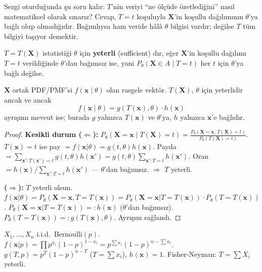 \begin{tanimgerekce}
Sezgi oturduğunda şu soru kalır: $T$'nin veriyi ``ne ölçüde özetlediğini''
nasıl matematiksel olarak sınarız? Cevap, $T = t$ koşuluyla $\mathbf{X}$'in
koşullu dağılımının $\theta$'ya bağlı olup olmadığıdır. Bağımlıysa ham veride
hâlâ $\theta$ bilgisi vardır; değilse $T$ tüm bilgiyi taşıyor demektir.
\end{tanimgerekce}

\begin{tanim}
\label{def:yeterli}
$T = T(\mathbf{X})$ istatistiği $\theta$ için \textbf{yeterli} (sufficient) dır, eğer
$\mathbf{X}$'in koşullu dağılımı $T = t$ verildiğinde $\theta$'dan bağımsız ise, yani
$P_\theta(\mathbf{X} \in A \mid T = t)$ her $t$ için $\theta$'ya bağlı değilse.
\end{tanim}

\begin{teorem}
\label{thm:fisher_neyman}
$\mathbf{X}$ ortak PDF/PMF'si $f(\mathbf{x} \mid \theta)$ olan rasgele vektör.
$T(\mathbf{X})$, $\theta$ için yeterlidir ancak ve ancak
\[
  f(\mathbf{x} \mid \theta) = g(T(\mathbf{x}), \theta) \cdot h(\mathbf{x})
\]
ayrışımı mevcut ise; burada $g$ yalnızca $T(\mathbf{x})$ ve $\theta$'ya, $h$ yalnızca $\mathbf{x}$'e bağlıdır.
\end{teorem}

\begin{proof}
\textbf{Kesikli durum ($\Leftarrow$):}
$P_\theta(\mathbf{X}=\mathbf{x} \mid T(\mathbf{X})=t) = \frac{P_\theta(\mathbf{X}=\mathbf{x},\, T(\mathbf{X})=t)}{P_\theta(T(\mathbf{X})=t)}$.
$T(\mathbf{x})=t$ ise pay $= f(\mathbf{x}|\theta) = g(t,\theta)h(\mathbf{x})$.
Payda $= \sum_{\mathbf{x}': T(\mathbf{x}')=t} g(t,\theta)h(\mathbf{x}') = g(t,\theta)\sum_{\mathbf{x}':T=t}h(\mathbf{x}')$.
Oran $= h(\mathbf{x})/\sum_{\mathbf{x}':T=t}h(\mathbf{x}')$ --- $\theta$'dan bağımsız. $\Rightarrow$ $T$ yeterli.

\textbf{($\Rightarrow$):} $T$ yeterli olsun.
$f(\mathbf{x}|\theta) = P_\theta(\mathbf{X}=\mathbf{x}, T=T(\mathbf{x}))
= P_\theta(\mathbf{X}=\mathbf{x}|T=T(\mathbf{x})) \cdot P_\theta(T=T(\mathbf{x}))$.
$P_\theta(\mathbf{X}=\mathbf{x}|T=T(\mathbf{x})) =: h(\mathbf{x})$ ($\theta$'dan bağımsız).
$P_\theta(T=T(\mathbf{x})) =: g(T(\mathbf{x}),\theta)$.
Ayrışım sağlandı.
\end{proof}

\begin{ornek}
$X_1,\ldots,X_n$ i.i.d.\ $\mathrm{Bernoulli}(p)$.
$f(\mathbf{x}|p) = \prod p^{x_i}(1-p)^{1-x_i} = p^{\sum x_i}(1-p)^{n-\sum x_i}$.
$g(T,p) = p^T(1-p)^{n-T}$ ($T = \sum x_i$), $h(\mathbf{x}) = 1$.
Fisher-Neyman: $T = \sum X_i$ yeterli.
\end{ornek}

